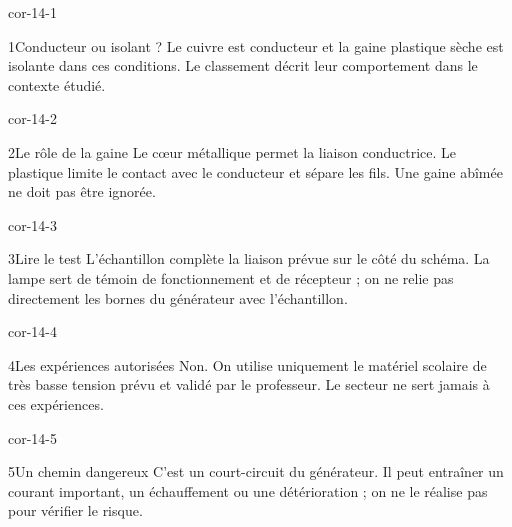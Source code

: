 \documentclass[12pt,twoside,openany]{book}
\begin{document}
\clearpage{}
\begin{blocLivre}{cor-14-1}
\begin{corrige}{1}{Conducteur ou isolant ?}
Le cuivre est conducteur et la gaine plastique sèche est isolante dans ces conditions. Le classement décrit leur comportement dans le contexte étudié.\par
\end{corrige}\end{blocLivre}
\begin{blocLivre}{cor-14-2}
\begin{corrige}{2}{Le rôle de la gaine}
Le cœur métallique permet la liaison conductrice. Le plastique limite le contact avec le conducteur et sépare les fils. Une gaine abîmée ne doit pas être ignorée.\par
\end{corrige}\end{blocLivre}
\begin{blocLivre}{cor-14-3}
\begin{corrige}{3}{Lire le test}
L’échantillon complète la liaison prévue sur le côté du schéma. La lampe sert de témoin de fonctionnement et de récepteur ; on ne relie pas directement les bornes du générateur avec l’échantillon.\par
{}
\end{corrige}\end{blocLivre}
\begin{blocLivre}{cor-14-4}
\begin{corrige}{4}{Les expériences autorisées}
Non. On utilise uniquement le matériel scolaire de très basse tension prévu et validé par le professeur. Le secteur ne sert jamais à ces expériences.\par
\end{corrige}\end{blocLivre}
\begin{blocLivre}{cor-14-5}
\begin{corrige}{5}{Un chemin dangereux}
C’est un court-circuit du générateur. Il peut entraîner un courant important, un échauffement ou une détérioration ; on ne le réalise pas pour vérifier le risque.\par
{}
\end{corrige}\end{blocLivre}
\end{document}
